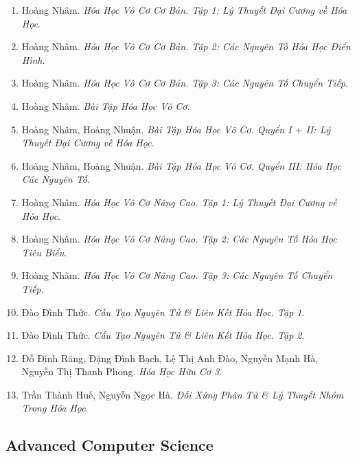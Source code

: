 \documentclass{article}
\begin{document}
\begin{enumerate}
	\item Hoàng Nhâm. \textit{Hóa Học Vô Cơ Cơ Bản. Tập 1: Lý Thuyết Đại Cương về Hóa Học}.
	\item Hoàng Nhâm. \textit{Hóa Học Vô Cơ Cơ Bản. Tập 2: Các Nguyên Tố Hóa Học Điển Hình}.
	\item Hoàng Nhâm. \textit{Hóa Học Vô Cơ Cơ Bản. Tập 3: Các Nguyên Tố Chuyển Tiếp}.
	\item Hoàng Nhâm. \textit{Bài Tập Hóa Học Vô Cơ}.
	\item Hoàng Nhâm, Hoàng Nhuận. \textit{Bài Tập Hóa Học Vô Cơ. Quyển I $+$ II: Lý Thuyết Đại Cương về Hóa Học}.
	\item Hoàng Nhâm, Hoàng Nhuận. \textit{Bài Tập Hóa Học Vô Cơ. Quyển III: Hóa Học Các Nguyên Tố}.
	\item Hoàng Nhâm. \textit{Hóa Học Vô Cơ Nâng Cao. Tập 1: Lý Thuyết Đại Cương về Hóa Học}.
	\item Hoàng Nhâm. \textit{Hóa Học Vô Cơ Nâng Cao. Tập 2: Các Nguyên Tố Hóa Học Tiêu Biểu}.
	\item Hoàng Nhâm. \textit{Hóa Học Vô Cơ Nâng Cao. Tập 3: Các Nguyên Tố Chuyển Tiếp}.
	\item Đào Đình Thức. \textit{Cấu Tạo Nguyên Tử \& Liên Kết Hóa Học. Tập 1}.
	\item Đào Đình Thức. \textit{Cấu Tạo Nguyên Tử \& Liên Kết Hóa Học. Tập 2}.
	\item Đỗ Đình Răng, Đặng Đình Bạch, Lệ Thị Anh Đào, Nguyễn Mạnh Hà, Nguyễn Thị Thanh Phong. \textit{Hóa Học Hữu Cơ 3}.
	\item Trần Thành Huế, Nguyễn Ngọc Hà. \textit{Đối Xứng Phân Tử \& Lý Thuyết Nhóm Trong Hóa Học}.
\end{enumerate}


\subsection{Advanced Computer Science}
\end{document}
